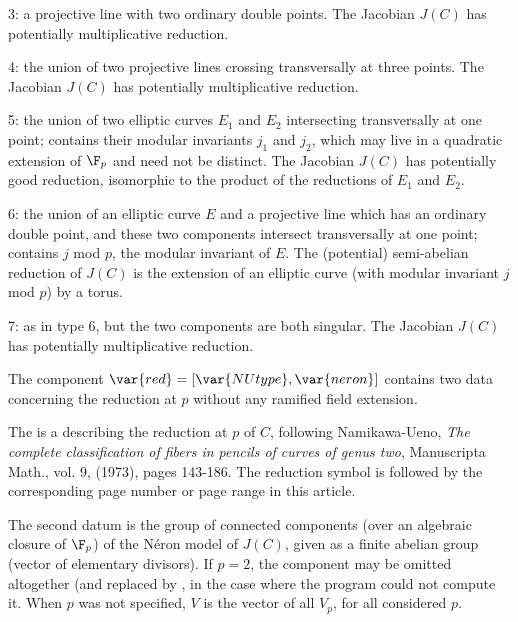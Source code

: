 \item 3: a projective line with two ordinary double points. The Jacobian
$J(C)$ has potentially multiplicative reduction.

\item 4: the union of two projective lines crossing transversally at three
points. The Jacobian $J(C)$ has potentially multiplicative reduction.

\item 5: the union of two elliptic curves $E_1$ and $E_2$ intersecting
transversally at one point;  contains their modular invariants
$j_1$ and $j_2$, which may live in a quadratic extension of $\F_p$ and need
not be distinct. The Jacobian $J(C)$ has potentially good reduction,
isomorphic to the product of the reductions of $E_1$ and $E_2$.

\item 6: the union of an elliptic curve $E$ and a projective line which has
an ordinary double point, and these two components intersect transversally
at one point;  contains $j$ mod $p$, the modular invariant of $E$.
The (potential) semi-abelian reduction of $J(C)$ is the extension of an
elliptic curve (with modular invariant $j$ mod $p$) by a torus.

\item 7: as in type 6, but the two components are both singular. The
Jacobian $J(C)$ has potentially multiplicative reduction.

The component $\var{red} = [\var{NUtype}, \var{neron}]$ contains two data
concerning the reduction at $p$ without any ramified field extension.

The  is a  describing the reduction at $p$ of $C$,
following Namikawa-Ueno, \emph{The complete classification of fibers in
pencils of curves of genus two}, Manuscripta Math., vol. 9, (1973), pages
143-186. The reduction symbol is followed by the corresponding page number
or page range in this article.

The second datum  is the group of connected components (over an
algebraic closure of $\F_p$) of the N\'eron model of $J(C)$, given as a
finite abelian group (vector of elementary divisors).
\smallskip
If $p = 2$, the  component may be omitted altogether (and
replaced by \kbd{[]}, in the case where the program could not compute it.
When $p$ was not specified, $V$ is the vector of all $V_p$, for all
considered $p$.


